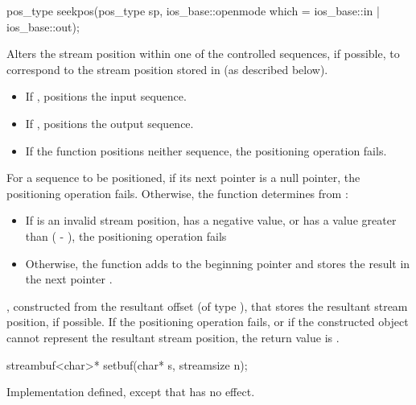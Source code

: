 %
\begin{itemdecl}
pos_type seekpos(pos_type sp, ios_base::openmode which
                  = ios_base::in | ios_base::out);
\end{itemdecl}

\begin{itemdescr}
\pnum
\effects
Alters the stream position within one of the
controlled sequences, if possible, to correspond to the
stream position stored in 
(as described below).
\begin{itemize}
\item
If
,
positions the input sequence.
\item
If
,
positions the output sequence.
\item
If the function positions neither sequence, the positioning operation fails.
\end{itemize}

\pnum
For a sequence to be positioned, if its next pointer is a null pointer,
the positioning operation fails.
Otherwise, the function determines  from
:
\begin{itemize}
\item
If  is an invalid stream position,
has a negative value, or
has a value greater than ( - ),
the positioning operation fails
\item
Otherwise, the function
adds  to the beginning pointer  and
stores the result in the next pointer .
\end{itemize}

\pnum
\returns
{},
constructed from the resultant offset 
(of type
),
that stores the resultant stream position, if possible.
If the positioning operation fails, or
if the constructed object cannot represent the resultant stream position,
the return value is
.
\end{itemdescr}

%
\begin{itemdecl}
streambuf<char>* setbuf(char* s, streamsize n);
\end{itemdecl}

\begin{itemdescr}
\pnum
\effects
Implementation defined, except that
has no effect.%
\end{itemdescr}

